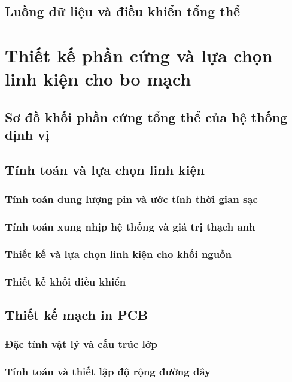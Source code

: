 \documentclass[
  a4paper,
]{report}
\begin{document}
\subsection{Luồng dữ liệu và điều khiển tổng thể}

\section{Thiết kế phần cứng và lựa chọn linh kiện cho bo mạch}

\subsection{Sơ đồ khối phần cứng tổng thể của hệ thống định vị}

\subsection{Tính toán và lựa chọn linh kiện}

\subsubsection{Tính toán dung lượng pin và ước tính thời gian sạc}

\subsubsection{Tính toán xung nhịp hệ thống và giá trị thạch anh}

\subsubsection{Thiết kế và lựa chọn linh kiện cho khối nguồn}

\subsubsection{Thiết kế khối điều khiển}

\subsection{Thiết kế mạch in PCB}

\subsubsection{Đặc tính vật lý và cấu trúc lớp}

\subsubsection{Tính toán và thiết lập độ rộng đường dây}
\end{document}
